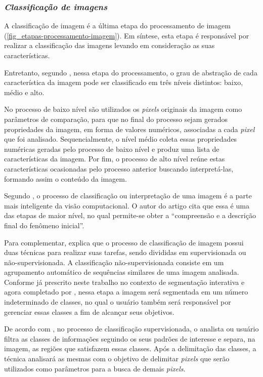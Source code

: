 \subsubsection{\textit{Classificação de imagens}}
\label{classificacao-de-imagem}

A classificação de imagem é a última etapa do processamento de imagem (\autoref{fig_etapas-processamento-imagem}). Em síntese, esta etapa é responsável por realizar a classificação das imagens levando em consideração as suas características.

Entretanto, segundo , nessa etapa do processamento, o grau de abstração de cada característica da imagem pode ser classificado em três níveis distintos: baixo, médio e alto.

No processo de baixo nível são utilizados os \textit{pixels} originais da imagem como parâmetros de comparação, para que no final do processo sejam gerados propriedades da imagem, em forma de valores numéricos, associadas a cada \textit{pixel} que foi analisado. Sequencialmente, o nível médio coleta essas propriedades numéricas geradas pelo processo de baixo nível e produz uma lista de características da imagem. Por fim, o processo de alto nível reúne estas características ocasionadas pelo processo anterior buscando interpretá-las, formando assim o conteúdo da imagem.

Segundo , o processo de classificação ou interpretação de uma imagem é a parte mais inteligente da visão computacional. O autor do artigo cita que essa é uma das etapas de maior nível, no qual permite-se obter a “compreensão e a descrição final do fenômeno inicial”.

Para complementar,  explica que o processo de classificação de imagem possui duas técnicas para realizar suas tarefas, sendo divididas em supervisionada ou não-supervisionada. A classificação não-supervisionada consiste em um agrupamento automático de sequências similares de uma imagem analisada. Conforme já prescrito neste trabalho no contexto de segmentação interativa e agora completado por , nessa etapa a imagem será segmentada em um número indeterminado de classes, no qual o usuário também será responsável por gerenciar essas classes a fim de alcançar seus objetivos.

De acordo com , no processo de classificação supervisionada, o analista ou usuário filtra as classes de informações seguindo os seus padrões de interesse e separa, na imagem, as regiões que satisfazem essas classes. Após a delimitação das classes, a técnica analisará as mesmas com o objetivo de delimitar \textit{pixels} que serão utilizados como parâmetros para a busca de demais \textit{pixels}.


